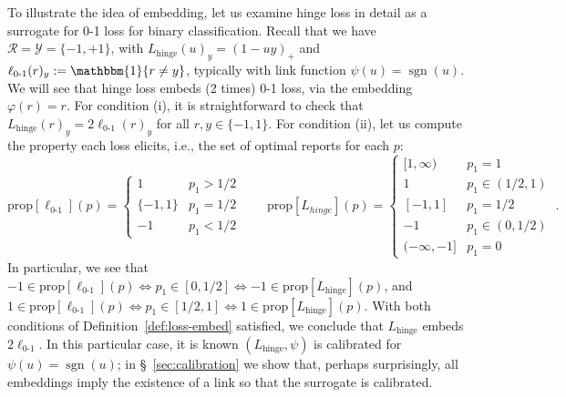 \documentclass[12pt]{article}
\newcommand{\prop}[1]{\mathrm{prop}[#1]}
\newcommand{\R}{\mathcal{R}}
\newcommand{\Y}{\mathcal{Y}}
\newcommand{\ones}{\mathbbm{1}}
\newcommand{\Ind}[1]{\ones\{#1\}}
\newcommand{\hinge}{L_{\mathrm{hinge}}}
\newcommand{\ellzo}{\ell_{\text{0-1}}}
\DeclareMathOperator*{\sgn}{sgn}
\begin{document}
To illustrate the idea of embedding, let us examine hinge loss in detail as a surrogate for 0-1 loss for binary classification.
Recall that we have $\R = \Y = \{-1, +1\}$, with $\hinge(u)_y = (1 - uy)_+$ and $\ellzo(r)_y := \Ind{r\neq y}$, typically with link function $\psi(u) = \sgn(u)$.
We will see that hinge loss embeds (2 times) 0-1 loss, via the embedding $\varphi(r) = r$.
For condition (i), it is straightforward to check that $\hinge(r)_y = 2\ellzo(r)_y$ for all $r,y\in\{-1,1\}$.
For condition (ii), let us compute the property each loss elicits, i.e., the set of optimal reports for each $p$:
\[
\prop{\ellzo}(p) = \begin{cases}
1 & p_1 > 1/2 \\
\{-1,1\} & p_1 = 1/2\\
-1 & p_1 < 1/2
\end{cases}
\qquad
\prop{L_{hinge}}(p) = \begin{cases}
[1,\infty) & p_1 = 1\\
1 & p_1 \in (1/2,1) \\
[-1,1] & p_1 = 1/2\\
-1& p_1 \in (0, 1/2)\\
(-\infty, -1]& p_1 = 0
\end{cases}~.
\]
In particular, we see that $-1 \in \prop{\ellzo}(p) \iff p_1 \in [0, 1/2] \iff -1 \in \prop{\hinge}(p)$, and $1 \in \prop{\ellzo}(p) \iff p_1 \in [1/2,1] \iff 1 \in \prop{\hinge}(p)$.
With both conditions of Definition~\ref{def:loss-embed} satisfied, we conclude that $\hinge$ embeds $2\ellzo$.
In this particular case, it is known $(\hinge,\psi)$ is calibrated for $\psi(u) = \sgn(u)$; in \S~\ref{sec:calibration} we show that, perhaps surprisingly, all embeddings imply the existence of a link so that the surrogate is calibrated.
\end{document}
